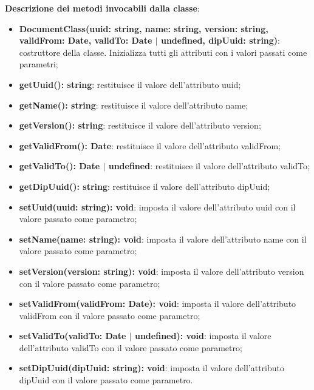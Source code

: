 \documentclass[a4paper,12pt]{article}
\begin{document}
{{{              \noindent \textbf{Descrizione dei metodi invocabili dalla classe}:
                \begin{itemize}
                    \item \textbf{DocumentClass(uuid: string, name: string, version: string, validFrom: Date, validTo: Date $|$ undefined, dipUuid: string)}: costruttore della classe. Inizializza tutti gli attributi con i valori passati come parametri;
                    \item \textbf{getUuid(): string}: restituisce il valore dell'attributo uuid;
                    \item \textbf{getName(): string}: restituisce il valore dell'attributo name;
                    \item \textbf{getVersion(): string}: restituisce il valore dell'attributo version;
                    \item \textbf{getValidFrom(): Date}: restituisce il valore dell'attributo validFrom;
                    \item \textbf{getValidTo(): Date $|$ undefined}: restituisce il valore dell'attributo validTo;
                    \item \textbf{getDipUuid(): string}: restituisce il valore dell'attributo dipUuid;
                    \item \textbf{setUuid(uuid: string): void}: imposta il valore dell'attributo uuid con il valore passato come parametro;
                    \item \textbf{setName(name: string): void}: imposta il valore dell'attributo name con il valore passato come parametro;
                    \item \textbf{setVersion(version: string): void}: imposta il valore dell'attributo version con il valore passato come parametro;
                    \item \textbf{setValidFrom(validFrom: Date): void}: imposta il valore dell'attributo validFrom con il valore passato come parametro;
                    \item \textbf{setValidTo(validTo: Date $|$ undefined): void}: imposta il valore dell'attributo validTo con il valore passato come parametro;
                    \item \textbf{setDipUuid(dipUuid: string): void}: imposta il valore dell'attributo dipUuid con il valore passato come parametro.
                \end{itemize}
}}}
\end{document}
